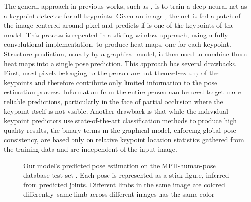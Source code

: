\documentclass{article}
\begin{document}
The general approach in previous works, such as \cite{pishchulin15,Tompson14}, is to train a deep neural net as a keypoint detector for all keypoints. Given an image , the net is fed a patch of the image   centered around pixel  and predicts if  is one of the  keypoints of the model. This process is repeated in a sliding window approach, using a fully convolutional implementation, to produce  heat maps, one for each keypoint. Structure prediction, usually by a graphical model, is then used to combine these heat maps into a single pose prediction. This approach has several drawbacks. First, most pixels belonging to the person are not themselves any of the keypoints and therefore contribute only limited information to the pose estimation process. Information from the entire person can be used to get more reliable predictions, particularly in the face of partial occlusion where the keypoint itself is not visible. Another drawback is that while the individual keypoint predictors use state-of-the-art classification methods to produce high quality results, the binary terms in the graphical model, enforcing global pose consistency, are based only on relative keypoint location statistics gathered from the training data and are independent of the input image. \\
\begin{figure}[ht]
	\centering



	\caption{Our model's predicted pose estimation on the MPII-human-pose database test-set \cite{andriluka14}. Each pose is represented as a stick figure, inferred from predicted joints.	Different limbs in the same image are colored differently, same limb across different images has the same color.}
\end{figure}\\
\end{document}
